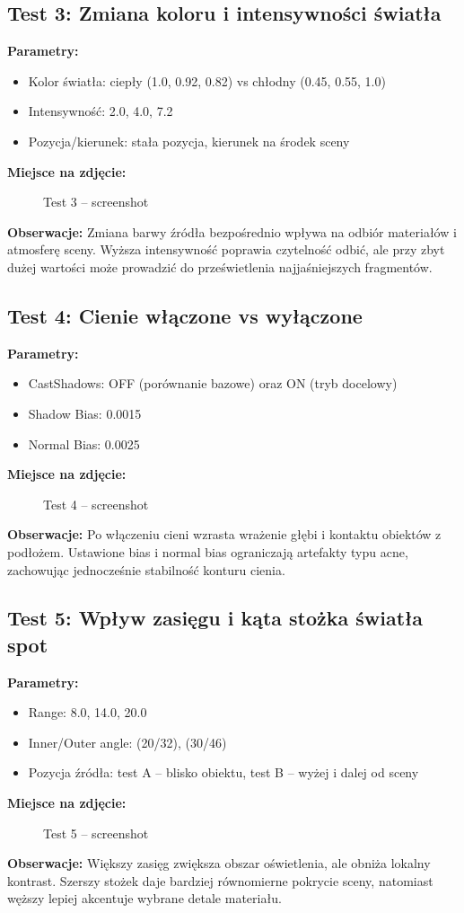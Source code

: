 \documentclass[12pt,a4paper]{article}
\begin{document}
\subsection{Test 3: Zmiana koloru i intensywności światła}
\textbf{Parametry:}
\begin{itemize}
  \item Kolor światła: ciepły (1.0, 0.92, 0.82) vs chłodny (0.45, 0.55, 1.0)
  \item Intensywność: 2.0, 4.0, 7.2
  \item Pozycja/kierunek: stała pozycja, kierunek na środek sceny
\end{itemize}
\textbf{Miejsce na zdjęcie:}
\begin{figure}[H]
\centering
\fbox{\rule{0pt}{6cm}\rule{0.9\linewidth}{0pt}}
\caption{Test 3 -- screenshot}
\end{figure}
\textbf{Obserwacje:} Zmiana barwy źródła bezpośrednio wpływa na odbiór materiałów i atmosferę sceny. Wyższa intensywność poprawia czytelność odbić, ale przy zbyt dużej wartości może prowadzić do prześwietlenia najjaśniejszych fragmentów.

\subsection{Test 4: Cienie włączone vs wyłączone}
\textbf{Parametry:}
\begin{itemize}
  \item CastShadows: OFF (porównanie bazowe) oraz ON (tryb docelowy)
  \item Shadow Bias: 0.0015
  \item Normal Bias: 0.0025
\end{itemize}
\textbf{Miejsce na zdjęcie:}
\begin{figure}[H]
\centering
\fbox{\rule{0pt}{6cm}\rule{0.9\linewidth}{0pt}}
\caption{Test 4 -- screenshot}
\end{figure}
\textbf{Obserwacje:} Po włączeniu cieni wzrasta wrażenie głębi i kontaktu obiektów z podłożem. Ustawione bias i normal bias ograniczają artefakty typu acne, zachowując jednocześnie stabilność konturu cienia.

\subsection{Test 5: Wpływ zasięgu i kąta stożka światła spot}
\textbf{Parametry:}
\begin{itemize}
  \item Range: 8.0, 14.0, 20.0
  \item Inner/Outer angle: (20\degree/32\degree), (30\degree/46\degree)
  \item Pozycja źródła: test A -- blisko obiektu, test B -- wyżej i dalej od sceny
\end{itemize}
\textbf{Miejsce na zdjęcie:}
\begin{figure}[H]
\centering
\fbox{\rule{0pt}{6cm}\rule{0.9\linewidth}{0pt}}
\caption{Test 5 -- screenshot}
\end{figure}
\textbf{Obserwacje:} Większy zasięg zwiększa obszar oświetlenia, ale obniża lokalny kontrast. Szerszy stożek daje bardziej równomierne pokrycie sceny, natomiast węższy lepiej akcentuje wybrane detale materiału.
\end{document}
